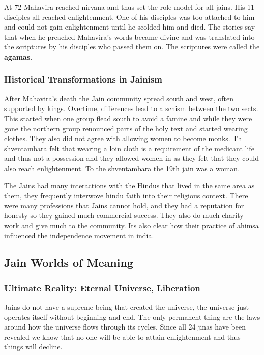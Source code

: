 \documentclass{article}
\begin{document}
At 72 Mahavira reached nirvana and thus set the role model for all jains. His 11 disciples all reached enlightenment. One of his disciples was too attached to him and could not gain enlightenment until he scolded him and died. The stories say that when he preached Mahavira's words became divine and was translated into the scriptures by his disciples who passed them on. The scriptures were called the \textbf{agamas}.

\subsubsection{Historical Transformations in Jainism}
\label{ssub:historical_transformations_in_jainism}
After Mahavira's death the Jain community spread south and west, often supported by kings. Overtime, differences lead to a schism between the two sects. This started when one group flead south to avoid a famine and while they were gone the northern group renounced parts of the holy text and started wearing clothes. They also did not agree with allowing women to become monks. Th shventambara felt that wearing a loin cloth is a requirement of the medicant life and thus not a possession and they allowed women in as they felt that they could also reach enlightenment. To the shventambara the 19th jain was a woman.

The Jains had many interactions with the Hindus that lived in the same area as them, they frequently interwove hindu faith into their religious context. There were many professions that Jains cannot hold, and they had a reputation for honesty so they gained much commercial success. They also do much charity work and give much to the community. Its also clear how their practice of ahimsa influenced the independence movement in india.

\subsection{Jain Worlds of Meaning}
\label{sub:jain_worlds_of_meaning}
\subsubsection{Ultimate Reality: Eternal Universe, Liberation}
\label{ssub:ultimate_reality_eternal_universe_liberation}
Jains do not have a supreme being that created the universe, the universe just operates itself without beginning and end. The only permanent thing are the laws around how the universe flows through its cycles. Since all 24 jinas have been revealed we know that no one will be able to attain enlightenment and thus things will decline.
\end{document}
